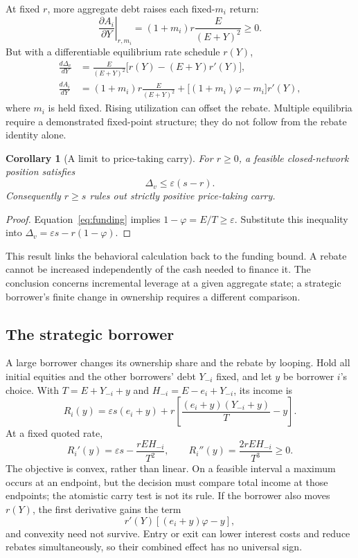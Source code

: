 \documentclass[12pt,oneside]{article}
\newtheorem{corollary}[proposition]{Corollary}
\begin{document}
At fixed $r$, more aggregate debt raises each fixed-$m_i$ return:
\[
 \left.\frac{\partial A_i}{\partial Y}\right|_{r,m_i}
 =(1+m_i)r\frac{E}{(E+Y)^2}\geq0.
\]
But with a differentiable equilibrium rate schedule $r(Y)$,
\begin{align*}
 \frac{d\Delta_v}{dY}
 &=\frac{E}{(E+Y)^2}\bigl[r(Y)-(E+Y)r'(Y)\bigr],\\
 \frac{dA_i}{dY}
 &=(1+m_i)r\frac{E}{(E+Y)^2}
   +\bigl[(1+m_i)\varphi-m_i\bigr]r'(Y),
\end{align*}
where $m_i$ is held fixed. Rising utilization can offset the rebate.
Multiple equilibria require a demonstrated fixed-point structure;
they do not follow from the rebate identity alone.

\begin{corollary}[A limit to price-taking carry]
\label{cor:carry}
For $r\geq0$, a feasible closed-network position satisfies
\[
 \Delta_v\leq\varepsilon(s-r).
\]
Consequently $r\geq s$ rules out strictly positive price-taking carry.
\end{corollary}
\begin{proof}
Equation~\eqref{eq:funding} implies $1-\varphi=E/T\geq\varepsilon$.
Substitute this inequality into
$\Delta_v=\varepsilon s-r(1-\varphi)$.
\end{proof}
This result links the behavioral calculation back to the funding
bound. A rebate cannot be increased independently of the cash needed
to finance it. The conclusion concerns incremental leverage at a given
aggregate state; a strategic borrower's finite change in ownership
requires a different comparison.

\subsection{The strategic borrower}
A large borrower changes its ownership share and the rebate by looping.
Hold all initial equities and the other borrowers' debt $Y_{-i}$ fixed,
and let $y$ be borrower $i$'s choice. With
$T=E+Y_{-i}+y$ and $H_{-i}=E-e_i+Y_{-i}$, its income is
\[
 R_i(y)=\varepsilon s(e_i+y)
       +r\left[\frac{(e_i+y)(Y_{-i}+y)}{T}-y\right].
\]
At a fixed quoted rate,
\[
 R_i'(y)=\varepsilon s-\frac{rEH_{-i}}{T^2},\qquad
 R_i''(y)=\frac{2rEH_{-i}}{T^3}\geq0.
\]
The objective is convex, rather than linear. On a feasible interval a
maximum occurs at an endpoint, but the decision must compare total
income at those endpoints; the atomistic carry test is not its rule.
If the borrower also moves $r(Y)$, the first derivative gains the term
\[
 r'(Y)\left[(e_i+y)\varphi-y\right],
\]
and convexity need not survive. Entry or exit can lower interest costs
and reduce rebates simultaneously, so their combined effect has no
universal sign.
\end{document}
